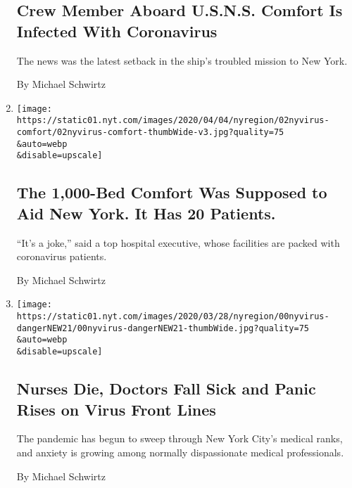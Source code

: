 \begin{enumerate}
  \hypertarget{crew-member-aboard-usns-comfort-is-infected-with-coronavirus}{%
  \subsection{Crew Member Aboard U.S.N.S. Comfort Is Infected With
  Coronavirus}\label{crew-member-aboard-usns-comfort-is-infected-with-coronavirus}}

  The news was the latest setback in the ship's troubled mission to New
  York.

  By Michael Schwirtz
\item
  \href{/2020/04/02/nyregion/ny-coronavirus-usns-comfort.html}{}

  \texttt{[image: https://static01.nyt.com/images/2020/04/04/nyregion/02nyvirus-comfort/02nyvirus-comfort-thumbWide-v3.jpg?quality=75\\\&auto=webp\\\&disable=upscale]}

  \hypertarget{the-1000-bed-comfort-was-supposed-to-aid-new-york-it-has-20-patients}{%
  \subsection{The 1,000-Bed Comfort Was Supposed to Aid New York. It Has
  20
  Patients.}\label{the-1000-bed-comfort-was-supposed-to-aid-new-york-it-has-20-patients}}

  ``It's a joke,'' said a top hospital executive, whose facilities are
  packed with coronavirus patients.

  By Michael Schwirtz
\item
  \href{/2020/03/30/nyregion/ny-coronavirus-doctors-sick.html}{}

  \texttt{[image: https://static01.nyt.com/images/2020/03/28/nyregion/00nyvirus-dangerNEW21/00nyvirus-dangerNEW21-thumbWide.jpg?quality=75\\\&auto=webp\\\&disable=upscale]}

  \hypertarget{nurses-die-doctors-fall-sick-and-panic-rises-on-virus-front-lines}{%
  \subsection{Nurses Die, Doctors Fall Sick and Panic Rises on Virus
  Front
  Lines}\label{nurses-die-doctors-fall-sick-and-panic-rises-on-virus-front-lines}}

  The pandemic has begun to sweep through New York City's medical ranks,
  and anxiety is growing among normally dispassionate medical
  professionals.

  By Michael Schwirtz
\end{enumerate}


